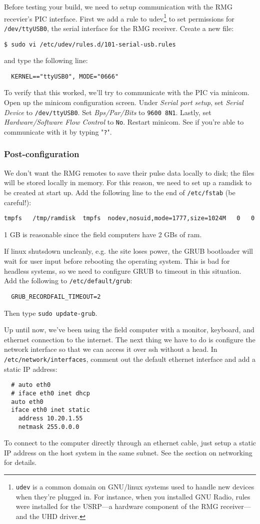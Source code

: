 \documentclass[letter]{article}
\newcounter{foot}
\begin{document}
Before testing your build, we need to setup communication with the RMG recevier's PIC interface. First we 
add a rule to udev\footnote{\texttt{udev} is a common domain on GNU/linux systems used to handle 
new devices when they're plugged in. For instance, when you installed GNU Radio, rules were installed 
for the USRP---a hardware component of the RMG receiver---and the UHD driver.} to set permissions for 
\texttt{/dev/ttyUSB0}, the serial interface for the RMG receiver. Create a new file: 
\begin{verbatim}
$ sudo vi /etc/udev/rules.d/101-serial-usb.rules
\end{verbatim}
and type the following line: 
\begin{verbatim}
  KERNEL=="ttyUSB0", MODE="0666"
\end{verbatim}
To verify that this worked, we'll try to communicate with the PIC via minicom. Open up the minicom
configuration screen. Under \textit{Serial port setup}, set \textit{Serial Device} to \texttt{/dev/ttyUSB0}.
Set \textit{Bps/Par/Bits} to \texttt{9600 8N1}. Lastly, set \textit{Hardware/Software Flow Control} to 
\texttt{No}. Restart minicom. See if you're able to communicate with it by typing "\texttt{?}".  

\subsubsection{Post-configuration} 

We don't want the RMG remotes to save their pulse data locally to disk; the files will be stored
locally in memory. For this reason, we need to set up a ramdisk to be created at start up. Add 
the following line to the end of \texttt{/etc/fstab} (be careful!): 
\begin{verbatim}
tmpfs   /tmp/ramdisk  tmpfs  nodev,nosuid,mode=1777,size=1024M   0   0
\end{verbatim}
1 GB is reasonable since the field computers have 2 GBs of ram. 

If linux shutsdown uncleanly, e.g. the site loses power, the GRUB bootloader will wait for user 
input before rebooting the operating system. This is bad for headless systems, so we need to 
configure GRUB to timeout in this situation. Add the following to \texttt{/etc/default/grub}: 
\begin{verbatim}
  GRUB_RECORDFAIL_TIMEOUT=2
\end{verbatim}
Then type \texttt{sudo update-grub}. 

Up until now, we've been using the field computer with a monitor, keyboard, and ethernet connection
to the internet. The next thing we have to do is configure the network interface so that we can 
access it over ssh without a head. In \texttt{/etc/network/interfaces}, comment out the default 
ethernet interface and add a static IP address: 
\begin{verbatim}
  # auto eth0
  # iface eth0 inet dhcp
  auto eth0
  iface eth0 inet static
    address 10.20.1.55
    netmask 255.0.0.0
\end{verbatim}
To connect to the computer directly through an ethernet cable, just setup a static IP address on 
the host system in the same subnet. See the section on networking for details. 
\end{document}
